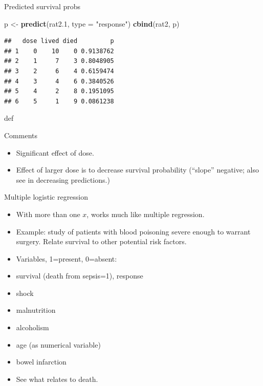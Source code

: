 \documentclass[ignorenonframetext,]{beamer}
\newenvironment{Shaded}{\begin{snugshade}}{\end{snugshade}}
\newcommand{\DataTypeTok}[1]{\textcolor[rgb]{0.13,0.29,0.53}{#1}}
\newcommand{\FloatTok}[1]{\textcolor[rgb]{0.00,0.00,0.81}{#1}}
\newcommand{\KeywordTok}[1]{\textcolor[rgb]{0.13,0.29,0.53}{\textbf{#1}}}
\newcommand{\NormalTok}[1]{#1}
\newcommand{\StringTok}[1]{\textcolor[rgb]{0.31,0.60,0.02}{#1}}
\begin{document}
\begin{frame}[fragile]{Predicted survival probs}
\protect\hypertarget{predicted-survival-probs}{}

\begin{Shaded}
\begin{Highlighting}[]
\NormalTok{p <-}\StringTok{ }\KeywordTok{predict}\NormalTok{(rat2}\FloatTok{.1}\NormalTok{, }\DataTypeTok{type =} \StringTok{"response"}\NormalTok{)}
\KeywordTok{cbind}\NormalTok{(rat2, p)}
\end{Highlighting}
\end{Shaded}

\begin{verbatim}
##   dose lived died         p
## 1    0    10    0 0.9138762
## 2    1     7    3 0.8048905
## 3    2     6    4 0.6159474
## 4    3     4    6 0.3840526
## 5    4     2    8 0.1951095
## 6    5     1    9 0.0861238
\end{verbatim}

def

\end{frame}

\begin{frame}{Comments}
\protect\hypertarget{comments-10}{}

\begin{itemize}
\item
  Significant effect of dose.
\item
  Effect of larger dose is to decrease survival probability (``slope''
  negative; also see in decreasing predictions.)
\end{itemize}

\end{frame}

\begin{frame}{Multiple logistic regression}
\protect\hypertarget{multiple-logistic-regression}{}

\begin{itemize}
\item
  With more than one \(x\), works much like multiple regression.
\item
  Example: study of patients with blood poisoning severe enough to
  warrant surgery. Relate survival to other potential risk factors.
\item
  Variables, 1=present, 0=absent:
\item
  survival (death from sepsis=1), response
\item
  shock
\item
  malnutrition
\item
  alcoholism
\item
  age (as numerical variable)
\item
  bowel infarction
\item
  See what relates to death.
\end{itemize}

\end{frame}
\end{document}
